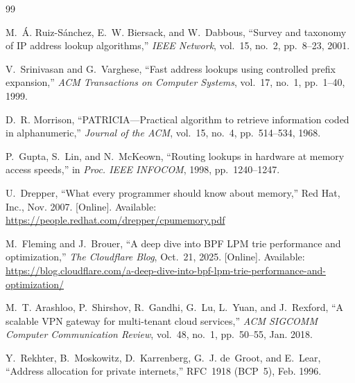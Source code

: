 \documentclass[11pt,a4paper,oneside]{report}
\begin{document}
\begingroup
\renewcommand{\bibname}{References}
\let\chapter\section
\small
\begin{thebibliography}{99}
\setlength{\itemsep}{2pt}

M.~Á. Ruiz-Sánchez, E.~W. Biersack, and W.~Dabbous, ``Survey and taxonomy of IP
address lookup algorithms,'' \emph{IEEE Network}, vol.~15, no.~2, pp.~8--23,
2001.

V.~Srinivasan and G.~Varghese, ``Fast address lookups using controlled prefix
expansion,'' \emph{ACM Transactions on Computer Systems}, vol.~17, no.~1,
pp.~1--40, 1999.

D.~R. Morrison, ``PATRICIA---Practical algorithm to retrieve information coded
in alphanumeric,'' \emph{Journal of the ACM}, vol.~15, no.~4, pp.~514--534,
1968.

P.~Gupta, S.~Lin, and N.~McKeown, ``Routing lookups in hardware at memory access
speeds,'' in \emph{Proc. IEEE INFOCOM}, 1998, pp.~1240--1247.

U.~Drepper, ``What every programmer should know about memory,'' Red Hat, Inc.,
Nov. 2007. [Online]. Available:
\url{https://people.redhat.com/drepper/cpumemory.pdf}

M.~Fleming and J.~Brouer, ``A deep dive into BPF LPM trie performance and
optimization,'' \emph{The Cloudflare Blog}, Oct.~21, 2025. [Online]. Available:
\url{https://blog.cloudflare.com/a-deep-dive-into-bpf-lpm-trie-performance-and-optimization/}

M.~T. Arashloo, P.~Shirshov, R.~Gandhi, G.~Lu, L.~Yuan, and J.~Rexford, ``A
scalable VPN gateway for multi-tenant cloud services,'' \emph{ACM SIGCOMM
Computer Communication Review}, vol.~48, no.~1, pp.~50--55, Jan. 2018.

Y.~Rekhter, B.~Moskowitz, D.~Karrenberg, G.~J. de~Groot, and E.~Lear, ``Address
allocation for private internets,'' RFC~1918 (BCP~5), Feb. 1996.


\end{thebibliography}
\end{document}
